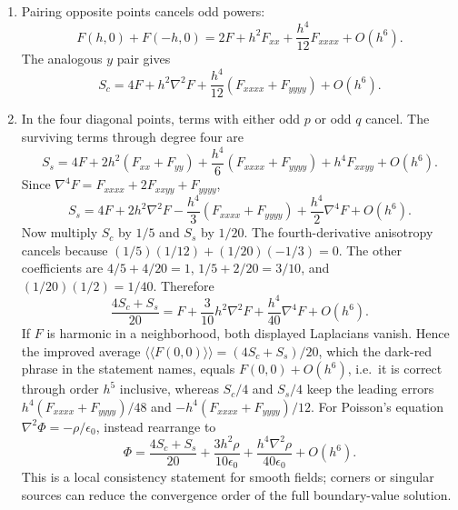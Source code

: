 \begin{enumerate}
\item[(a)] Pairing opposite points cancels odd powers:
\[
F(h,0)+F(-h,0)=2F+h^2F_{xx}+\frac{h^4}{12}F_{xxxx}+O(h^6).
\]
The analogous $y$ pair gives
\[
\boxed{S_c=4F+h^2\nabla^2F+\frac{h^4}{12}(F_{xxxx}+F_{yyyy})+O(h^6).}
\]
\item[(b)] In the four diagonal points, terms with either odd $p$ or odd $q$
cancel. The surviving terms through degree four are
\[
S_s=4F+2h^2(F_{xx}+F_{yy})
+\frac{h^4}{6}(F_{xxxx}+F_{yyyy})+h^4F_{xxyy}+O(h^6).
\]
Since $\nabla^4F=F_{xxxx}+2F_{xxyy}+F_{yyyy}$,
\[
\boxed{S_s=4F+2h^2\nabla^2F
-\frac{h^4}{3}(F_{xxxx}+F_{yyyy})+\frac{h^4}{2}\nabla^4F+O(h^6).}
\]
Now multiply $S_c$ by $1/5$ and $S_s$ by $1/20$.
The fourth-derivative anisotropy cancels because
$(1/5)(1/12)+(1/20)(-1/3)=0$. The other coefficients are
$4/5+4/20=1$, $1/5+2/20=3/10$, and $(1/20)(1/2)=1/40$.
Therefore
\[
\boxed{\frac{4S_c+S_s}{20}
=F+\frac3{10}h^2\nabla^2F+\frac{h^4}{40}\nabla^4F+O(h^6).}
\]
If $F$ is harmonic in a neighborhood, both displayed Laplacians vanish. Hence the improved average $\langle\!\langle F(0,0)\rangle\!\rangle=(4S_c+S_s)/20$, which the dark-red phrase in the statement names, equals $F(0,0)+O(h^6)$, i.e.\ it is correct through order $h^5$ inclusive, whereas $S_c/4$ and $S_s/4$ keep the leading errors $h^4(F_{xxxx}+F_{yyyy})/48$ and $-h^4(F_{xxxx}+F_{yyyy})/12$.
For Poisson's equation $\nabla^2\Phi=-\rho/\epsilon_0$, instead rearrange to
\[
\boxed{\Phi=\frac{4S_c+S_s}{20}
+\frac{3h^2\rho}{10\epsilon_0}
+\frac{h^4\nabla^2\rho}{40\epsilon_0}+O(h^6).}
\]
This is a local consistency statement for smooth fields; corners or singular
sources can reduce the convergence order of the full boundary-value solution.
\end{enumerate}


